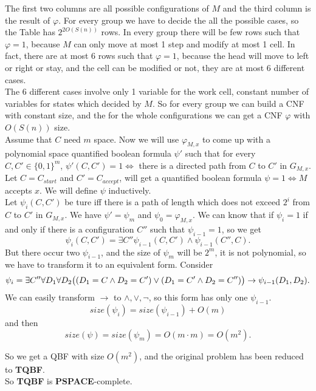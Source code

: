 \documentclass[a4papper]{article}
\theoremstyle{neosn}
\begin{document}
    The first two columns are all possible configurations of $M$ and the third column is the result of
    $\varphi$.
    For every group we have to decide the all the possible cases, so the Table has $2^{2 O(S(n))}$ rows.
    In every group there will be few rows such that $\varphi = 1$, because $M$ can only move at most 1 step
    and modify at most 1 cell.
    In fact, there are at most 6 rows such that $\varphi = 1$, because the head will move to left or right
    or stay, and the cell can be modified or not, they are at most 6 different cases. \\
    The 6 different cases involve only 1 variable for the work cell, constant number of variables for
    states which decided by $M$.
    So for every group we can build a CNF with constant size, and the for the whole configurations we can
    get a CNF $\varphi$ with $O(S(n))$ size. \\
    Assume that $C$ need $m$ space.
    Now we will use $\varphi_{M,x}$ to come up with a polynomial space quantified boolean formula $\psi'$
    such that for every $C,C' \in \{0,1\}^m$, $\psi'(C,C') = 1 \Leftrightarrow$ there is a
    directed path from $C$ to $C'$ in $G_{M,x}$.
    Let $C=C_{start}$ and $C'=C_{accept}$, will get a quantified boolean formula $\psi = 1 \Leftrightarrow M$
    accepts $x$.
    We will define $\psi$ inductively.\\
    Let $\psi_i(C,C')$ be ture iff there is a path of length which does not exceed $2^i$ from
    $C$ to $C'$ in $G_{M,x}$.
    We have $\psi' = \psi_m$ and $\psi_0 = \varphi_{M,x}$.
    We can know that if $\psi_i = 1$ if and only if there is a configuration $C''$ such that $\psi_{i-1} = 1$,
    so we get
    \[
        \psi_i(C,C') = \exists C'' \psi_{i-1}(C, C') \land \psi_{i-1}(C'', C).
    \]
    But there occur two $\psi_{i-1}$, and the size of $\psi_m$ will be $2^m$, it is not polynomial, so
    we have to transform it to an equivalent form.
    Consider
    \[
        \psi_i = \exists C'' \forall D_1 \forall D_2 \big{(}(D_1 = C \land D_2 = C') \lor (D_1 = C'
        \land D_2 = C'') \big{)} \rightarrow \psi_{i-1}(D_1,D_2).
    \]
    We can easily transform $\rightarrow$ to $\land, \lor, \neg$, so this form has only one $\psi_{i-1}$.
    \[
        size(\psi_i) = size(\psi_{i-1}) + O(m)
    \]
    and then
    \[
        size(\psi) = size(\psi_m) = O(m \cdot m) = O(m^2).
    \]

    So we get a QBF with size $O(m^2)$, and the original problem has been reduced to \textbf{TQBF}.\\
    So \textbf{TQBF} is \textbf{PSPACE}-complete.
\end{document}
